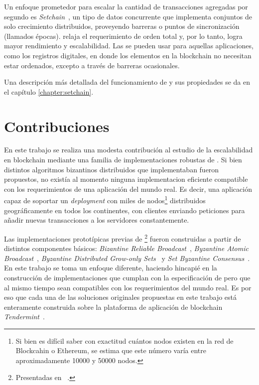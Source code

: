 %
Un enfoque prometedor para escalar la cantidad de transacciones agregadas por segundo
es \textit{Setchain}~\cite{Capretto.2022.Setchain},
un tipo de datos concurrente que implementa conjuntos de solo crecimiento distribuidos,
proveyendo barreras o puntos de sincronización (llamados épocas).
%
\setchain relaja el requerimiento de orden total y, por lo tanto, logra mayor
rendimiento y escalabilidad.
%
Las \setchains se pueden usar para aquellas aplicaciones, como los registros digitales,
en donde los elementos en la blockchain no necesitan estar ordenados, excepto a través
de barreras ocasionales.

Una descripción más detallada del funcionamiento de \setchain y sus propiedades se da
en el capítulo \ref{chapter:setchain}.

\section{Contribuciones}
En este trabajo se realiza una modesta contribución al estudio de la escalabilidad en blockchain mediante 
una familia de implementaciones robustas de \setchain.
%
Si bien distintos algoritmos bizantinos distribuidos que implementaban \setchain fueron
propuestos, no existía al momento ninguna implementacion eficiente compatible con
los requerimientos de una aplicación del mundo real.
Es decir, una aplicación capaz de soportar un \textit{deployment} con miles de nodos\footnote{Si bien
es difícil saber con exactitud cuántos nodos existen en la red de Blockcahin o Ethereum, se estima
que este número varía entre aproximadamente 10000 y 50000 nodos.}
distribuidos geográficamente en todos los continentes, con clientes enviando peticiones para
añadir nuevas transacciones a los servidores constantemente.

Las implementaciones prototípicas previas de \setchain\footnote{Presentadas en ~\cite{Capretto.2022.Setchain}.} fueron construidas
a partir de distintos
componentes básicos: \emph{Bizantine Reliable Broadcast}~\cite{DBLP:journals/iandc/Bracha87, raynal.dist.systems},
\emph{Byzantine Atomic Broadcast}~\cite{Defago2004BAB},
\emph{Byzantine Distributed Grow-only Sets}~\cite{Cholvi2021BDSO-arxiv} y \emph{Set Byzantine Consensus}~\cite{redbelly}.
%
En este trabajo se toma un enfoque diferente, haciendo hincapié en la construcción de implementaciones
que cumplan con la especificación de \setchain pero que al mismo tiempo sean compatibles con los requerimientos
del mundo real.
Es por eso que cada una de las soluciones originales propuestas en este trabajo está enteramente construida sobre 
la plataforma de aplicación de blockchain \textit{Tendermint}~\cite{Buchman.2018.Tendermint}.

